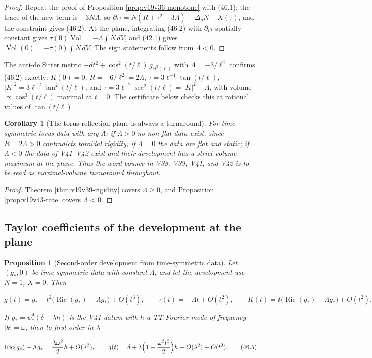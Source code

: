 \documentclass[11pt]{article}
\newtheorem{proposition}[theorem]{Proposition}
\newtheorem{corollary}[theorem]{Corollary}
\theoremstyle{remark}
\begin{document}
\begin{proof}
Repeat the proof of Proposition \ref{prop:v19v36-monotone} with
(46.1): the trace of the new term is \(-3N\Lambda\), so
\(\partial_t\tau=N(R+\tau^2-3\Lambda)-\Delta_gN+X(\tau)\), and the
constraint gives (46.2).  At the plane, integrating (46.2) with
\(\partial_t\tau\) spatially constant gives
\(\dot\tau(0)\operatorname{Vol}=-\Lambda\int N\,dV\), and (42.1) gives
\(\ddot{\operatorname{Vol}}(0)=-\dot\tau(0)\int N\,dV\).  The sign
statements follow from \(\Lambda<0\).
\end{proof}

The anti-de Sitter metric \(-dt^2+\cos^2(t/\ell)\,g_{\mathbb H^3(\ell)}\)
with \(\Lambda=-3/\ell^2\) confirms (46.2) exactly: \(K(0)=0\),
\(R=-6/\ell^2=2\Lambda\), \(\tau=3\ell^{-1}\tan(t/\ell)\),
\(|K|^2=3\ell^{-2}\tan^2(t/\ell)\), and
\(\dot\tau=3\ell^{-2}\sec^2(t/\ell)=|K|^2-\Lambda\), with volume
\(\propto\cos^3(t/\ell)\) maximal at \(t=0\).  The certificate below
checks this at rational values of \(\tan(t/\ell)\).

\begin{corollary}[The torus reflection plane is always a turnaround]
\label{cor:v19v43-turnaround}
For time-symmetric torus data with any \(\Lambda\): if \(\Lambda>0\)
no non-flat data exist, since \(R=2\Lambda>0\) contradicts toroidal
rigidity; if \(\Lambda=0\) the data are flat and static; if
\(\Lambda<0\) the data of V41--V42 exist and their development has a
strict volume maximum at the plane.  Thus the word bounce in V38, V39,
V41, and V42 is to be read as maximal-volume turnaround throughout.
\end{corollary}

\begin{proof}
Theorem \ref{thm:v19v39-rigidity} covers \(\Lambda\geq0\), and
Proposition \ref{prop:v19v43-rate} covers \(\Lambda<0\).
\end{proof}

\subsection{Taylor coefficients of the development at the plane}

\begin{proposition}[Second-order development from time-symmetric data]
\label{prop:v19v43-taylor}
Let \((g_*,0)\) be time-symmetric data with constant \(\Lambda\), and
let the development use \(N=1\), \(X=0\).  Then

\[
 g(t)=g_*-t^2\bigl(\operatorname{Ric}(g_*)-\Lambda g_*\bigr)+O(t^3),
 \qquad
 \tau(t)=-\Lambda t+O(t^2),\qquad
 K(t)=t\bigl(\operatorname{Ric}(g_*)-\Lambda g_*\bigr)+O(t^2).            \tag{46.4}
\]

If \(g_*=\psi_*^4(\delta+\lambda h)\) is the V41 datum with \(h\) a TT
Fourier mode of frequency \(|k|=\omega\), then to first order in
\(\lambda\)

\[
 \operatorname{Ric}(g_*)-\Lambda g_*=\frac{\lambda\omega^2}{2}h+O(\lambda^2),
 \qquad
 g(t)=\delta+\lambda\Bigl(1-\frac{\omega^2t^2}2\Bigr)h+O(\lambda^2)+O(t^3).
                                                                    \tag{46.5}
\]
\end{proposition}
\end{document}
